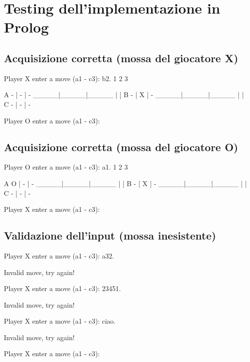 \documentclass{article}
\begin{document}
\section{Testing dell'implementazione in Prolog}

\subsection{Acquisizione corretta (mossa del giocatore X)}
    \begin{spverbatim}
    Player X enter a move (a1 - c3): b2.
         1     2     3

    A    -  |  -  |  -  
       _____|_____|_____
            |     |     
    B    -  |  X  |  -  
       _____|_____|_____
            |     |     
    C    -  |  -  |  -  

    Player O enter a move (a1 - c3): 
    \end{spverbatim}

\subsection{Acquisizione corretta (mossa del giocatore O)}
    \begin{spverbatim}
    Player O enter a move (a1 - c3): a1.
         1     2     3

    A    O  |  -  |  -  
       _____|_____|_____
            |     |     
    B    -  |  X  |  -  
       _____|_____|_____
            |     |     
    C    -  |  -  |  -  

    Player X enter a move (a1 - c3): 
    \end{spverbatim}

\subsection{Validazione dell'input (mossa inesistente)}
    \begin{spverbatim}
    Player X enter a move (a1 - c3): a32.

    Invalid move, try again!

    Player X enter a move (a1 - c3): 23451.  

    Invalid move, try again!

    Player X enter a move (a1 - c3): ciao.

    Invalid move, try again!

    Player X enter a move (a1 - c3): 
    \end{spverbatim}
\end{document}
